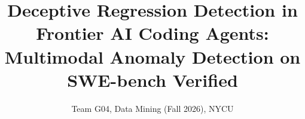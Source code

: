 \documentclass[11pt]{article}
\title{Deceptive Regression Detection in Frontier AI Coding Agents: Multimodal Anomaly Detection on SWE-bench Verified}
\author{Team G04, Data Mining (Fall 2026), NYCU}
\author{}
\begin{document}
\maketitle
\balance

\clearpage

\end{document}
